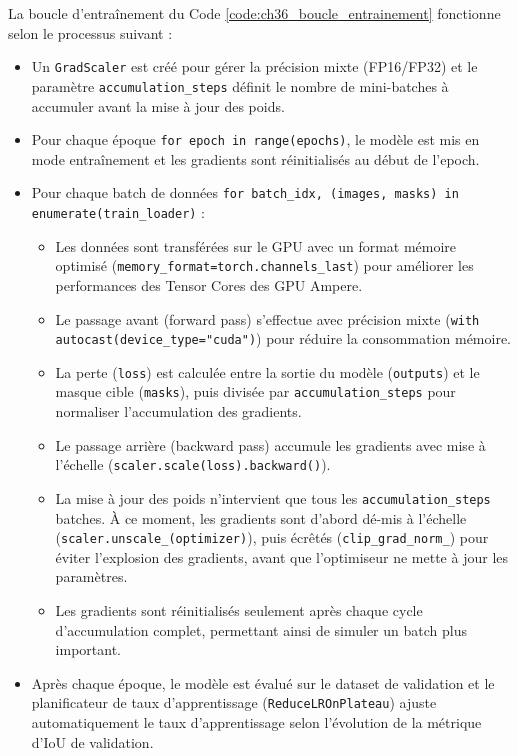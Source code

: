 La boucle d'entraînement du Code \ref{code:ch36_boucle_entrainement} fonctionne selon le processus suivant :
\begin{itemize}
    \item Un \texttt{GradScaler} est créé pour gérer la précision mixte (FP16/FP32) et le paramètre \texttt{accumulation\_steps} définit le nombre de mini-batches à accumuler avant la mise à jour des poids.
    \item Pour chaque époque \texttt{for epoch in range(epochs)}, le modèle est mis en mode entraînement et les gradients sont réinitialisés au début de l'epoch.
    \item Pour chaque batch de données \texttt{for batch\_idx, (images, masks) in enumerate(train\_loader)} :
    \begin{itemize}
        \item Les données sont transférées sur le GPU avec un format mémoire optimisé (\texttt{memory\_format=torch.channels\_last}) pour améliorer les performances des Tensor Cores des GPU Ampere.
        \item Le passage avant (forward pass) s'effectue avec précision mixte (\texttt{with autocast(device\_type="cuda")}) pour réduire la consommation mémoire.
        \item La perte (\texttt{loss}) est calculée entre la sortie du modèle (\texttt{outputs}) et le masque cible (\texttt{masks}), puis divisée par \texttt{accumulation\_steps} pour normaliser l'accumulation des gradients.
        \item Le passage arrière (backward pass) accumule les gradients avec mise à l'échelle (\texttt{scaler.scale(loss).backward()}).
        \item La mise à jour des poids n'intervient que tous les \texttt{accumulation\_steps} batches. À ce moment, les gradients sont d'abord dé-mis à l'échelle \\ (\texttt{scaler.unscale\_(optimizer)}), puis écrêtés (\texttt{clip\_grad\_norm\_}) pour éviter l'explosion des gradients, avant que l'optimiseur ne mette à jour les paramètres.
        \item Les gradients sont réinitialisés seulement après chaque cycle d'accumulation complet, permettant ainsi de simuler un batch plus important.
    \end{itemize}
    \item Après chaque époque, le modèle est évalué sur le dataset de validation et le planificateur de taux d'apprentissage (\texttt{ReduceLROnPlateau}) ajuste automatiquement le taux d'apprentissage selon l'évolution de la métrique d'IoU de validation.
\end{itemize}

